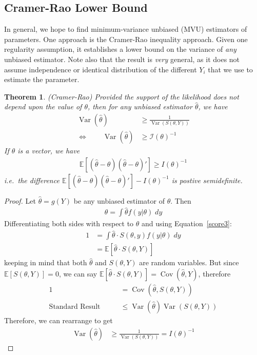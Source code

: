 \documentclass[12pt]{article}
\theoremstyle{plain}
\newtheorem{thm}{Theorem}[section]
\theoremstyle{definition}
\theoremstyle{remark}
\newcommand{\calI}{\mathcal{I}}
\newcommand{\E}{\mathbb{E}}
\newcommand{\Cov}{\operatorname{Cov}}
\newcommand{\Var}{\operatorname{Var}}
\begin{document}
\subsection{Cramer-Rao Lower Bound}

In general, we hope to find minimum-variance unbiased (MVU) estimators
of parameters. One approach is the Cramer-Rao inequality approach.
Given one regularity assumption, it establishes a lower bound on the
variance of \emph{any} unbiased estimator.
Note also that the result is \emph{very} general, as it does not assume
independence or identical distribution of the different $Y_i$ that we
use to estimate the parameter.

\begin{thm}\emph{(Cramer-Rao)}
Provided the support of the likelihood does \emph{not} depend upon the
value of $\theta$, then for \emph{any} unbiased estimator
$\hat{\theta}$, we have
\begin{align*}
  \Var(\hat{\theta})
  &\geq
  \frac{1}{\Var(S(\theta,Y))} \\
  \iff\qquad
  \Var(\hat{\theta})
  &\geq
  \calI(\theta)^{-1}
\end{align*}
If $\theta$ is a vector, we have
\begin{align*}
  \E\left[
    (\hat{\theta}-\theta)
    (\hat{\theta}-\theta)'
  \right]
  \geq I(\theta)^{-1}
\end{align*}
i.e.\ the difference
$\E\left[ (\hat{\theta}-\theta) (\hat{\theta}-\theta)' \right]
-I(\theta)^{-1}$ is postive semidefinite.
\end{thm}
\begin{proof}
Let $\hat{\theta}=g(Y)$ be any unbiased estimator of $\theta$. Then
\begin{align*}
  \theta = \int \hat{\theta} f(y|\theta) \; dy
\end{align*}
Differentiating both sides with respect to $\theta$ and using
Equation~\ref{score3}:
\begin{align*}
  1
  &= \int \hat{\theta} \cdot S(\theta,y) f(y|\theta)\; dy \\
  &= \E[\hat{\theta} \cdot S(\theta,Y)]
\end{align*}
keeping in mind that both $\hat{\theta}$ and $S(\theta,Y)$ are random
variables. But since $\E[S(\theta,Y)]=0$, we can say
$\E[\hat{\theta} \cdot S(\theta,Y)] = \Cov(\hat{\theta},Y)$, therefore
\begin{align*}
  1 &= \Cov(\hat{\theta}, S(\theta,Y)) \\
  \text{Standard Result} \qquad
  &\leq \Var(\hat{\theta}) \Var(S(\theta,Y))
\end{align*}
Therefore, we can rearrange to get
\begin{align*}
  \Var(\hat{\theta})
  &\geq
  \frac{1}{\Var(S(\theta,Y))}
  =I(\theta)^{-1}
\end{align*}
\end{proof}
\end{document}
